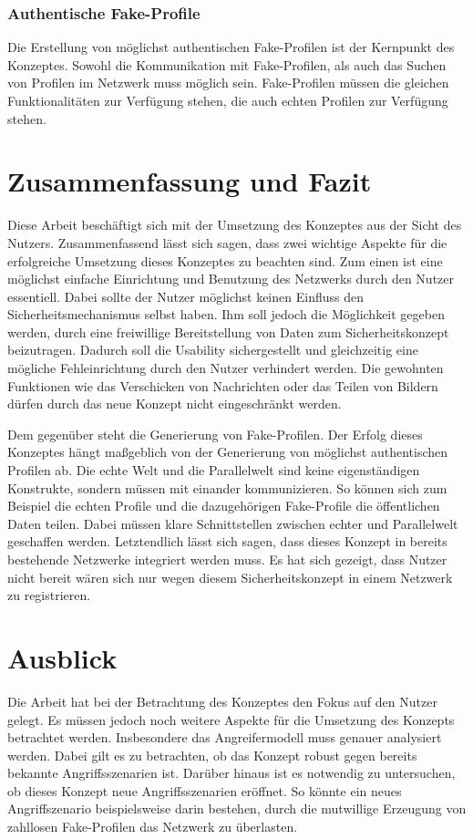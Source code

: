 \documentclass{sigchi}
\begin{document}
\subsubsection{Authentische Fake-Profile}
Die Erstellung von möglichst authentischen Fake-Profilen ist der Kernpunkt des Konzeptes. Sowohl die Kommunikation mit Fake-Profilen, als auch das Suchen von Profilen im Netzwerk muss möglich sein. Fake-Profilen müssen die gleichen Funktionalitäten zur Verfügung stehen, die auch echten Profilen zur Verfügung stehen.

\section{Zusammenfassung und Fazit}
Diese Arbeit beschäftigt sich mit der Umsetzung des Konzeptes aus der Sicht des Nutzers. Zusammenfassend lässt sich sagen, dass zwei wichtige Aspekte für die erfolgreiche Umsetzung dieses Konzeptes zu beachten sind. Zum einen ist eine möglichst einfache Einrichtung und Benutzung des Netzwerks durch den Nutzer essentiell. Dabei sollte der Nutzer möglichst keinen Einfluss den Sicherheitsmechanismus selbst haben. Ihm soll jedoch die Möglichkeit gegeben werden, durch eine freiwillige Bereitstellung von Daten zum Sicherheitskonzept beizutragen. Dadurch soll die Usability sichergestellt und gleichzeitig eine mögliche Fehleinrichtung durch den Nutzer verhindert werden. Die gewohnten Funktionen wie das Verschicken von Nachrichten oder das Teilen von Bildern dürfen durch das neue Konzept nicht eingeschränkt werden. 

Dem gegenüber steht die Generierung von Fake-Profilen. Der Erfolg dieses Konzeptes hängt maßgeblich von der Generierung von möglichst authentischen Profilen ab. Die echte Welt und die Parallelwelt sind keine eigenständigen Konstrukte, sondern müssen mit einander kommunizieren. So können sich zum Beispiel die echten Profile und die dazugehörigen Fake-Profile die öffentlichen Daten teilen. Dabei müssen klare Schnittstellen zwischen echter und Parallelwelt geschaffen werden. Letztendlich lässt sich sagen, dass dieses Konzept in bereits bestehende Netzwerke integriert werden muss. Es hat sich gezeigt, dass Nutzer nicht bereit wären sich nur wegen diesem Sicherheitskonzept in einem Netzwerk zu registrieren. 

\section{Ausblick}
Die Arbeit hat bei der Betrachtung des Konzeptes den Fokus auf den Nutzer gelegt. Es müssen jedoch noch weitere Aspekte für die Umsetzung des Konzepts betrachtet werden. Insbesondere das Angreifermodell muss genauer analysiert werden. Dabei gilt es zu betrachten, ob das Konzept robust gegen bereits bekannte Angriffsszenarien ist. Darüber hinaus ist es notwendig zu untersuchen, ob dieses Konzept neue Angriffsszenarien eröffnet. So könnte ein neues Angriffszenario beispielsweise darin bestehen, durch die mutwillige Erzeugung von zahllosen Fake-Profilen das Netzwerk zu überlasten. 
\end{document}
